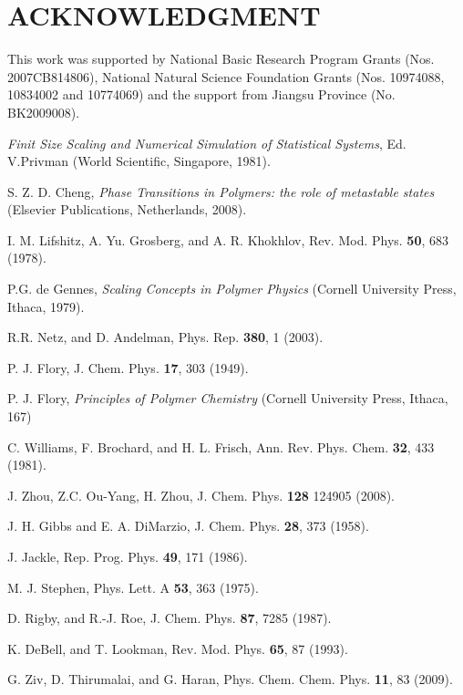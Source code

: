 \documentclass[aps,pre,twocolumn,showpacs,preprintnumbers,amsmath,amssymb]{revtex4-1}
\begin{document}
\section*{ACKNOWLEDGMENT}
This work was supported by National Basic Research Program Grants
(Nos. 2007CB814806), National Natural Science Foundation Grants
(Nos. 10974088, 10834002 and 10774069) and the support from
Jiangsu Province (No. BK2009008).

\begin{thebibliography}{10}

{\it Finit Size Scaling and Numerical Simulation of Statistical Systems},
Ed. V.Privman (World Scientific, Singapore, 1981).


S. Z. D. Cheng, {\it Phase Transitions in Polymers: the role of
metastable states} (Elsevier Publications, Netherlands, 2008).

I. M. Lifshitz, A. Yu. Grosberg, and A. R. Khokhlov, Rev. Mod. Phys.
{\bf 50}, 683 (1978).

P.G. de Gennes, {\it Scaling Concepts in Polymer Physics} (Cornell
University Press, Ithaca, 1979).

R.R. Netz, and D. Andelman, Phys. Rep. {\bf 380}, 1 (2003).

P. J. Flory, J. Chem. Phys. {\bf 17}, 303 (1949).

P. J. Flory, {\it Principles of Polymer Chemistry} (Cornell University
Press, Ithaca, 167)

C. Williams, F. Brochard, and H. L. Frisch, Ann. Rev. Phys. Chem.
{\bf 32}, 433 (1981).

J. Zhou, Z.C. Ou-Yang, H. Zhou, J. Chem. Phys. {\bf 128}
124905 (2008).

J. H. Gibbs and E. A. DiMarzio, J. Chem. Phys. {\bf 28}, 373 (1958).

J. Jackle, Rep. Prog. Phys. {\bf 49}, 171 (1986).

M. J. Stephen, Phys. Lett. A {\bf 53}, 363 (1975).

D. Rigby, and R.-J. Roe, J. Chem. Phys. {\bf 87}, 7285 (1987).

K. DeBell, and T. Lookman, Rev. Mod. Phys. {\bf 65}, 87 (1993).

G. Ziv, D. Thirumalai, and G. Haran, Phys. Chem. Chem. Phys. {\bf 11},
83 (2009).


\end{thebibliography}
\end{document}
